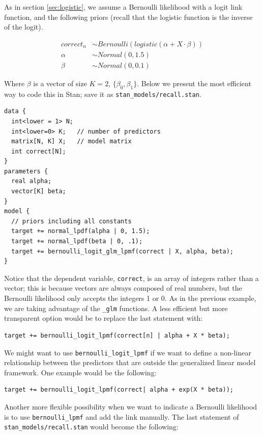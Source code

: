 \documentclass[12pt,]{krantz}
\theoremstyle{definition}
\theoremstyle{definition}
\theoremstyle{definition}
\theoremstyle{remark}
\begin{document}
As in section \ref{sec:logistic}, we assume a Bernoulli likelihood with
a logit link function, and the following priors (recall that the
logistic function is the inverse of the logit).

\begin{equation}
\begin{aligned}
correct_n &\sim Bernoulli( logistic(\alpha + X \cdot \beta))\\
\alpha &\sim Normal(0, 1.5) \\
\beta &\sim Normal(0, 0.1) 
\end{aligned}
\end{equation}

Where \(\beta\) is a vector of size \(K = 2\), \(\{\beta_0, \beta_1\}\).
Below we present the most efficient way to code this in Stan; save it as
\texttt{stan\_models/recall.stan}.

\begin{verbatim}
data {
  int<lower = 1> N;
  int<lower=0> K;   // number of predictors
  matrix[N, K] X;   // model matrix
  int correct[N];
}
parameters {
  real alpha;
  vector[K] beta;
}
model {
  // priors including all constants
  target += normal_lpdf(alpha | 0, 1.5);
  target += normal_lpdf(beta | 0, .1);
  target += bernoulli_logit_glm_lpmf(correct | X, alpha, beta);
}
\end{verbatim}

Notice that the dependent variable, \texttt{correct}, is an array of
integers rather than a vector; this is because vectors are always
composed of real numbers, but the Bernoulli likelihood only accepts the
integers 1 or 0. As in the previous example, we are taking advantage of
the \texttt{\_glm} functions. A less efficient but more transparent
option would be to replace the last statement with:

\begin{verbatim}
target += bernoulli_logit_lpmf(correct[n] | alpha + X * beta);
\end{verbatim}

We might want to use \texttt{bernoulli\_logit\_lpmf} if we want to
define a non-linear relationship between the predictors that are outside
the generalized linear model framework. One example would be the
following:

\begin{verbatim}
target += bernoulli_logit_lpmf(correct| alpha + exp(X * beta));
\end{verbatim}

Another more flexible possibility when we want to indicate a Bernoulli
likelihood is to use \texttt{bernoulli\_lpmf} and add the link manually.
The last statement of \texttt{stan\_models/recall.stan} would become the
following:
\end{document}
